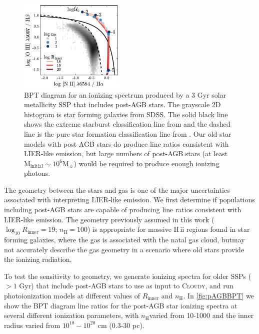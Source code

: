 \documentclass[linenumbers, tighten, trackchanges]{aastex61}%
\newcommand{\Fig}[1]{\autoref{fig:#1}}
\newcommand{\Cloudy}{\textsc{Cloudy}\xspace}
\newcommand{\logten}{\ensuremath{\log_{10}}}
\newcommand\Msun{\ensuremath{\mathrm{M_{\sun}}}}
\newcommand{\hii}{H\,{\sc ii}\xspace}
\newcommand{\nH}{\ensuremath{n_{\mathrm{H}}}}
\newcommand{\Rin}{\ensuremath{R_{\mathrm{inner}}}}
\newcommand{\logR}{\ensuremath{\logten R_{\mathrm{inner}}}}
\begin{document}
\begin{figure}[!htbp]
  \begin{centering}
    \includegraphics[width=0.45\textwidth]{f27.pdf}
    \caption{BPT diagram for an ionizing spectrum produced by a 3 Gyr solar metallicity SSP that includes post-AGB stars. The grayscale 2D histogram is star forming galaxies from SDSS. The solid black line shows the extreme starburst classification line from \citet{Kewley01} and the dashed line is the pure star formation classification line from \citet{Kauffmann03a}. Our old-star models with post-AGB stars do produce line ratios consistent with LIER-like emission, but large numbers of post-AGB stars (at least M$_{\mathrm{initial}} \sim 10^6\Msun{}$) would be required to produce enough ionizing photons.}
    \label{fig:pAGBBPT}
  \end{centering}
\end{figure}

The geometry between the stars and gas is one of the major uncertainties associated with interpreting LIER-like emission. We first determine if populations including post-AGB stars are capable of producing line ratios consistent with LIER-like emission. The geometry previously assumed in this work ($\logR = 19$; $\nH = 100$) is appropriate for massive \hii regions found in star forming galaxies, where the gas is associated with the natal gas cloud, butmay not accurately describe the gas geometry in a scenario where old stars provide the ionizing radiation.

To test the sensitivity to geometry, we generate ionizing spectra for older SSPs ($>1$ Gyr) that include post-AGB stars to use as input to \Cloudy, and run photoionization models at different values of \Rin{} and \nH{}. In \Fig{pAGBBPT} we show the BPT diagram line ratios for the post-AGB star ionizing spectra at several different ionization parameters, with \nH varied from 10-1000 and the inner radius varied from $10^{18}-10^{20}$ cm (0.3-30 pc). 
\end{document}
